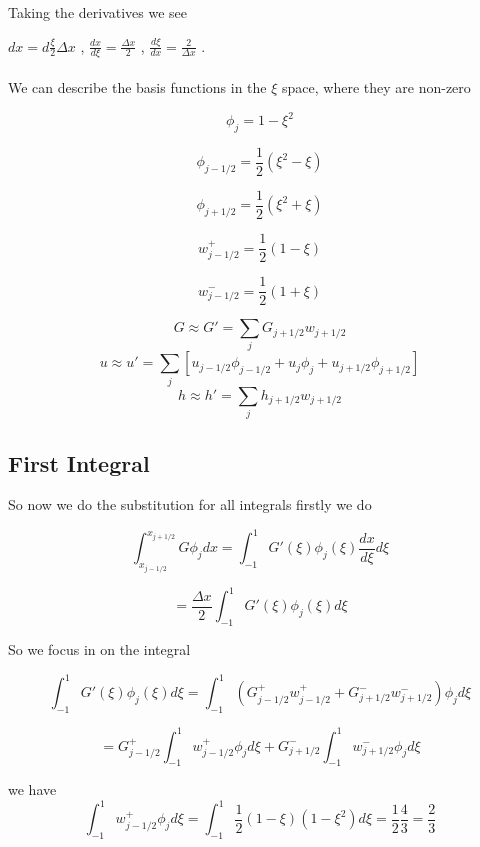 \documentclass[12pt]{article}
\begin{document}
Taking the derivatives we see


$dx = d\frac{\xi}{2}\Delta x$ , $\frac{dx}{d\xi} = \frac{\Delta x}{2}$ , $\frac{d\xi}{dx} = \frac{2}{\Delta x}$ . \\ \\ We can describe the basis functions in the $\xi$ space, where they are non-zero

\begin{equation}
\phi_{j} = 1 - \xi^2
\end{equation}

\begin{equation}
\phi_{j - 1/2} = \frac{1}{2}\left(\xi^2 - \xi\right)
\end{equation}

\begin{equation}
\phi_{j + 1/2} = \frac{1}{2}\left(\xi^2 + \xi\right)
\end{equation}

\begin{equation}
w^+_{j - 1/2} = \frac{1}{2}\left(1 - \xi\right)
\end{equation}

\begin{equation}
w^-_{j - 1/2} = \frac{1}{2}\left(1 + \xi\right)
\end{equation}

\[G \approx G' = \sum_{j}G_{j+1/2}w_{j+1/2}\]
\[u \approx u' = \sum_{j} \left[u_{j-1/2}\phi_{j-1/2} + u_{j}\phi_{j} + u_{j+1/2}\phi_{j+1/2}\right] \]
\[h \approx h' = \sum_{j}h_{j+1/2}w_{j+1/2}\]

\subsection{First Integral}
So now we do the substitution for all integrals firstly we do

\[\int_{x_{j-1/2}}^{x_{j+1/2}} G\phi_{j} dx = \int_{-1}^{1} G'(\xi)\phi_{j}(\xi) \frac{d x}{d\xi}d\xi\]

\[ = \frac{\Delta x}{2} \int_{-1}^{1} G'(\xi)\phi_{j}(\xi)d\xi\]

So we focus in on the integral

\[\int_{-1}^{1} G'(\xi)\phi_{j}(\xi)d\xi = \int_{-1}^{1} \left( G^+_{j-1/2} w^+_{j-1/2} +  G^-_{j+1/2} w^-_{j+1/2}  \right)\phi_{j}d\xi \]

\[= G^+_{j-1/2}\int_{-1}^{1}  w^+_{j-1/2}\phi_{j}d\xi  + G^-_{j+1/2}  \int_{-1}^{1}  w^-_{j+1/2} \phi_{j}d\xi\]

we have 
\[\int_{-1}^{1}  w^+_{j-1/2}\phi_{j}d\xi = \int_{-1}^{1} \frac{1}{2}\left(1 - \xi\right)\left(1 - \xi^2\right)d\xi = \frac{1}{2} \frac{4}{3} = \frac{2}{3}\]
\end{document}
